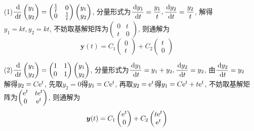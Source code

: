 \begin{solve}
(1)$\displaystyle\frac{\,\mathrm{d}}{\,\mathrm{d} t}\begin{pmatrix}y_1\\y_2\end{pmatrix}=\begin{pmatrix}\frac{1}{t}&0\\0&\frac{1}{t}\end{pmatrix}\begin{pmatrix}y_1\\y_2\end{pmatrix}$, 
分量形式为$\displaystyle\frac{\,\mathrm{d} y_1}{\,\mathrm{d} t}=\frac{y_1}{t},\frac{\,\mathrm{d} y_2}{\,\mathrm{d} t}=\frac{y_2}{t}$, 
解得$y_1=kt,y_2=kt$, 不妨取基解矩阵为$\begin{pmatrix}0&t\\t&0\end{pmatrix}$, 则通解为
\[\bm{y}(t)=C_1\begin{pmatrix}0\\t\end{pmatrix}+C_2\begin{pmatrix}t\\0\end{pmatrix}\]

(2)$\displaystyle\frac{\,\mathrm{d}}{\,\mathrm{d} t}\begin{pmatrix}y_1\\y_2\end{pmatrix}=\begin{pmatrix}1&1\\0&1\end{pmatrix}\begin{pmatrix}y_1\\y_2\end{pmatrix}$, 
分量形式为$\displaystyle\frac{\,\mathrm{d} y_1}{\,\mathrm{d} t}=y_1+y_2,\frac{\,\mathrm{d} y_2}{\,\mathrm{d} t}=y_2$, 
由$\displaystyle\frac{\,\mathrm{d} y_2}{\,\mathrm{d} t}=y_2$解得$y_2=C\mathrm{e}^t$, 先取$y_2=0$得$y_1=C\mathrm{e}^t$, 
再取$y_2=\mathrm{e}^t$得$y_1=C\mathrm{e}^t+t\mathrm{e}^t$, 不妨取基解矩阵为$\begin{pmatrix}\mathrm{e}^t&t\mathrm{e}^t\\0&\mathrm{e}^t\end{pmatrix}$, 则通解为
\[\bm{y}(t)=C_1\begin{pmatrix}\mathrm{e}^t\\0\end{pmatrix}+C_2\begin{pmatrix}t\mathrm{e}^t\\\mathrm{e}^t\end{pmatrix}\]


\end{solve}
